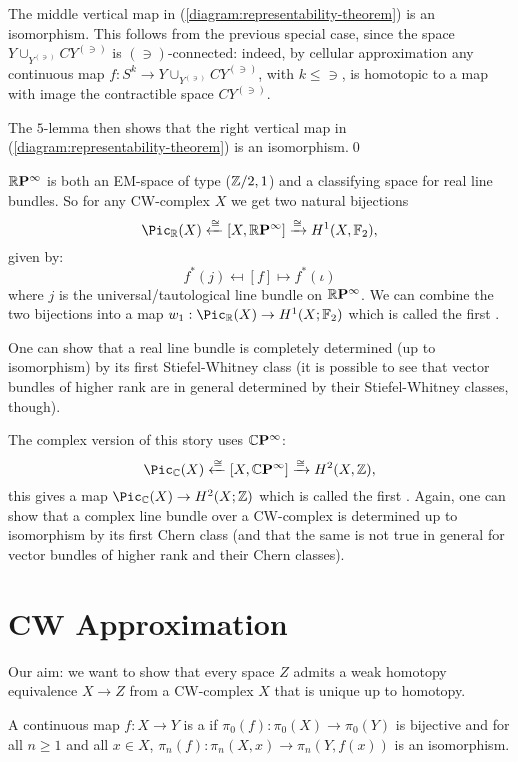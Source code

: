 The middle vertical map in (\ref{diagram:representability-theorem}) is an isomorphism. This follows from the previous special case, since the space $Y\cup_{Y^{(\ni)}}CY^{(\ni)}$ is $(\ni)$-connected: indeed, by cellular approximation any continuous map $f:S^k\to Y\cup_{Y^{(\ni)}}CY^{(\ni)}$, with $k\le\ni$, is homotopic to a map with image the contractible space $CY^{(\ni)}$.

The $5$-lemma then shows that the right vertical map in (\ref{diagram:representability-theorem}) is an isomorphism.\qed

\begin{example}
${{\mathbb R}\mathbf{P}^{\infty}}$ is both an EM-space of type (${\mathbb Z}/2,1$) and a classifying space for real line bundles. So for any CW-complex $X$ we get two natural bijections
\[
    \Pic_\R(X)\xleftarrow{\cong}[X,\rp{\infty}]\xto{\cong}H^1(X,\FF_2),
\]
given by:
\[
    f^*(j)\mapsfrom [f]\mapsto f^*(\iota)
\]
where $j$ is the universal/tautological line bundle on ${{\mathbb R}\mathbf{P}^{\infty}}$. We can combine the two bijections into a map $w_1:\Pic_\R(X)\to H^1(X;\FF_2)$ which is called the first .

One can show that a real line bundle is completely determined (up to isomorphism) by its first Stiefel-Whitney class (it is possible to see that vector bundles of higher rank are in general  determined by their Stiefel-Whitney classes, though).

The complex version of this story uses ${\mathbb{C}\mathbf{P}^{\infty}}$:
\[
    \Pic_\CC(X)\xleftarrow{\cong}[X,\cp{\infty}]\xto{\cong} H^2(X,\Z),
\]
this gives a map $\Pic_\CC(X)\to H^2(X;\Z)$ which is called the first . Again, one can show that a complex line bundle over a CW-complex is determined up to isomorphism by its first Chern class (and that the same is not true in general for vector bundles of higher rank and their Chern classes).
\end{example}

\section{CW Approximation}

Our aim: we want to show that every space $Z$ admits a weak homotopy equivalence $X\to Z$ from a CW-complex $X$ that is unique up to homotopy.

A continuous map $f:X\to Y$ is a  if $\pi_0(f):\pi_0(X)\to\pi_0(Y)$ is bijective and for all $n\ge1$ and all $x\in X$, $\pi_n(f):\pi_n(X,x)\to\pi_n(Y,f(x))$ is an isomorphism.

